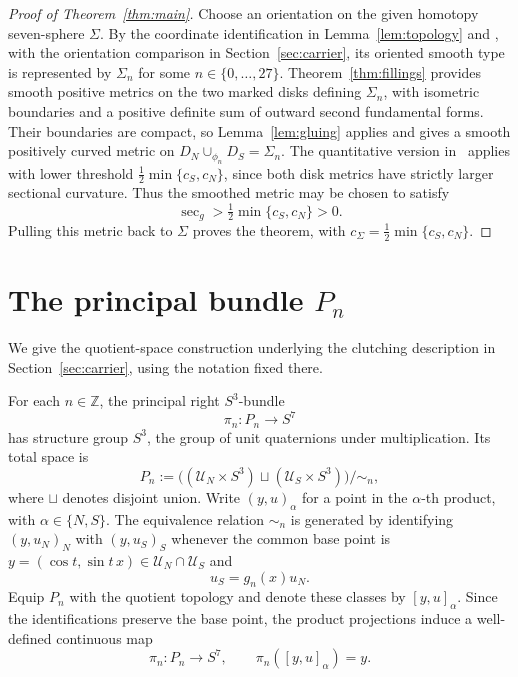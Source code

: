\documentclass[12pt]{amsart}
\numberwithin{equation}{section}
\theoremstyle{remark}
\newcommand{\Ksec}{\operatorname{sec}}
\begin{document}
\begin{proof}[Proof of Theorem~\ref{thm:main}]
Choose an orientation on the given homotopy seven-sphere \(\Sigma\).
By the coordinate identification in Lemma~\ref{lem:topology} and
\cite[Theorem~1]{DPR}, with the orientation comparison in
Section~\ref{sec:carrier}, its oriented smooth type is represented by
\(\Sigma_n\) for some \(n\in\{0,\ldots,27\}\).
Theorem~\ref{thm:fillings} provides smooth positive metrics on the
two marked disks defining \(\Sigma_n\), with isometric boundaries
and a positive definite sum of outward second fundamental forms.
Their boundaries are compact, so Lemma~\ref{lem:gluing} applies
and gives a smooth positively curved metric on
\(D_N\cup_{\phi_n}D_S=\Sigma_n\). The quantitative version in~\cite[Corollary~B, \(k=1\)]{RW}
applies with lower threshold \(\tfrac12\min\{c_S,c_N\}\), since
both disk metrics have strictly larger sectional curvature. Thus the
smoothed metric may be chosen to satisfy
\[
 \Ksec_g>\tfrac12\min\{c_S,c_N\}>0.
\]
Pulling this metric back to \(\Sigma\) proves the theorem, with
\(c_\Sigma=\tfrac12\min\{c_S,c_N\}\).
\end{proof}

\appendix
\section{The principal bundle \texorpdfstring{\(P_n\)}{Pn}}\label{app:principal}

We give the quotient-space construction underlying the clutching
description in Section~\ref{sec:carrier}, using the notation fixed
there.

For each \(n\in\mathbb Z\), the principal right
\(S^3\)-bundle
\[
 \pi_n:P_n\longrightarrow S^7
\]
has structure group \(S^3\), the group of unit quaternions under
multiplication. Its total space is
\[
 P_n:=\bigl((\mathcal U_N\times S^3)\sqcup
                 (\mathcal U_S\times S^3)\bigr)/{\sim_n},
\]
where \(\sqcup\) denotes disjoint union. Write \((y,u)_\alpha\)
for a point in the \(\alpha\)-th product, with \(\alpha\in\{N,S\}\).
The equivalence relation \(\sim_n\) is generated by identifying
\((y,u_N)_N\) with \((y,u_S)_S\) whenever the common base point is
\(y=(\cos t,\sin t\,x)\in\mathcal U_N\cap\mathcal U_S\) and
\begin{equation}\label{eq:principal-appendix}
u_S=g_n(x)u_N.
\end{equation}
Equip \(P_n\) with the quotient topology and denote these classes
by \([y,u]_\alpha\). Since the identifications preserve the base
point, the product projections induce a well-defined continuous map
\[
 \pi_n:P_n\longrightarrow S^7,\qquad
 \pi_n([y,u]_\alpha)=y.
\]
\end{document}
